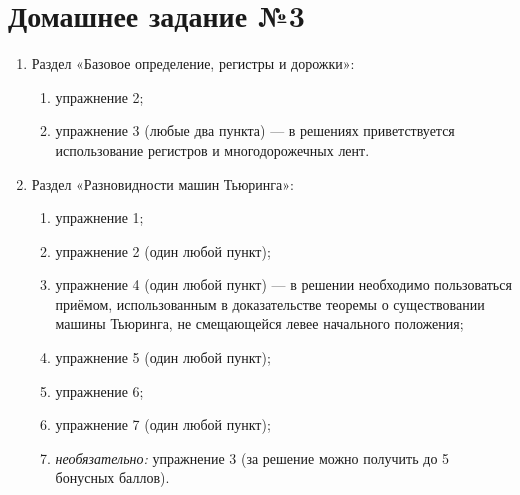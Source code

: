 \documentclass[12pt,a4paper]{article}
\begin{document}
\section*{Домашнее задание №3}


\begin{enumerate}
\item Раздел «Базовое определение, регистры и дорожки»:
  \begin{enumerate}
  \item упражнение 2;
  \item упражнение 3 (любые два пункта) — в решениях приветствуется использование регистров и многодорожечных лент.
  \end{enumerate}
\item Раздел «Разновидности машин Тьюринга»:
  \begin{enumerate}
  \item упражнение 1;
  \item упражнение 2 (один любой пункт);
  \item упражнение 4 (один любой пункт) — в решении необходимо пользоваться приёмом, использованным в доказательстве теоремы о существовании машины Тьюринга, не смещающейся левее начального положения;
  \item упражнение 5 (один любой пункт);
  \item упражнение 6;
  \item упражнение 7 (один любой пункт);
  \item \emph{необязательно:} упражнение 3 (за решение можно получить до 5 бонусных баллов).
  \end{enumerate}
\end{enumerate}
\end{document}
